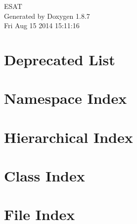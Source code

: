 \documentclass[twoside]{book}
\newcommand{\+}{\discretionary{\mbox{\scriptsize$\hookleftarrow$}}{}{}}
\newcommand{\clearemptydoublepage}{%
  \newpage{\pagestyle{empty}\cleardoublepage}%
}
\begin{document}
\hypersetup{pageanchor=false,
             bookmarks=true,
             bookmarksnumbered=true,
             pdfencoding=unicode
            }
\begin{titlepage}
\vspace*{7cm}
\begin{center}%
{\Large E\+S\+A\+T }\\
\vspace*{1cm}
{\large Generated by Doxygen 1.8.7}\\
\vspace*{0.5cm}
{\small Fri Aug 15 2014 15:11:16}\\
\end{center}
\end{titlepage}
\clearemptydoublepage
\tableofcontents
\clearemptydoublepage
{}
\hypersetup{pageanchor=true}

\chapter{Deprecated List}
\label{deprecated}
\hypertarget{deprecated}{}

\chapter{Namespace Index}

\chapter{Hierarchical Index}

\chapter{Class Index}

\chapter{File Index}

\end{document}
